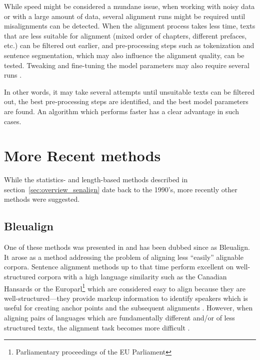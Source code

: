 While speed might be considered a mundane issue, when working with noisy data or with a large amount of data, several alignment runs might be required until misalignments can be detected. 
When the alignment process takes less time,  texts that are less suitable for alignment (mixed order of chapters, different prefaces, etc.) 
can be filtered out earlier, and pre-processing steps such as tokenization and sentence segmentation, which may also influence the alignment quality, can be tested. 
Tweaking and fine-tuning the model parameters may also require several runs \autocite{hunalign}. 

In other words, it may take several attempts until unsuitable texts can be filtered out, the best pre-processing steps are identified, and the best model parameters are found. 
An algorithm which performs faster has a clear advantage in such cases.


\section{More Recent methods}
While the statistics- and length-based  methods described in section~\ref{sec:overview_senalign} date back to the 1990's, more recently other methods were suggested.

\subsection{Bleualign}

One of these methods was presented in \cite{sennrich-volk-2010-mt} and has been dubbed since as Bleualign. 
It arose as a method addressing  the problem of aligning less \enquote{easily} alignable corpora. 
Sentence alignment methods up to that time perform excellent on well-structured corpora with a high language similarity such as the Canadian Hansards  or the Europarl\footnote{Parliamentary proceedings of the EU Parliament}  which are considered easy to align because they are well-structured---they provide markup information to identify speakers which is useful for creating anchor points and the subsequent alignments \autocites{simard-plamondon-1996-bilingual,sennrich-volk-2011-iterative}. 
However, when aligning pairs of languages which are fundamentally different and/or of less structured texts, the alignment task becomes more difficult \autocite{sennrich-volk-2010-mt}.

